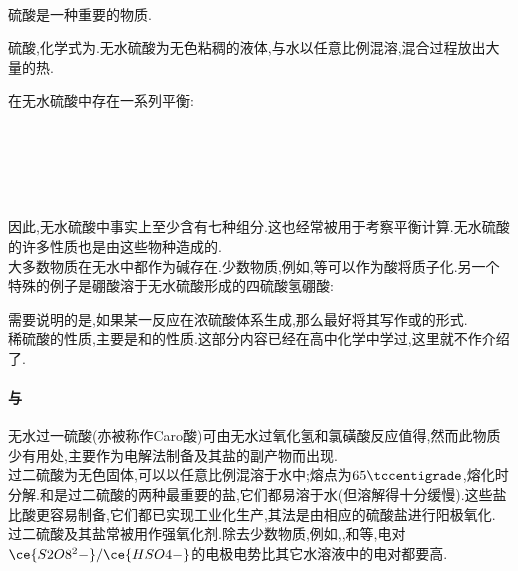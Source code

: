 \documentclass{ctexart}
\begin{document}
\paragraph{}
硫酸是一种重要的物质.
\begin{substance}[\ce{H2SO4}]
    硫酸,化学式为.无水硫酸为无色粘稠的液体,与水以任意比例混溶,混合过程放出大量的热.
\end{substance}
在无水硫酸中存在一系列平衡:
\begin{center}
    \\
    \\
    \\
    \\
\end{center}
因此,无水硫酸中事实上至少含有七种组分.这也经常被用于考察平衡计算.无水硫酸的许多性质也是由这些物种造成的.\\
\indent 大多数物质在无水中都作为碱存在.少数物质,例如,等可以作为酸将质子化.另一个特殊的例子是硼酸溶于无水硫酸形成的四硫酸氢硼酸:
\begin{center}
\end{center}
\indent 需要说明的是,如果某一反应在浓硫酸体系生成,那么最好将其写作或的形式.\\
\indent 稀硫酸的性质,主要是和的性质.这部分内容已经在高中化学中学过,这里就不作介绍了.
\paragraph{与}
无水过一硫酸(亦被称作Caro酸)可由无水过氧化氢和氯磺酸反应值得,然而此物质少有用处,主要作为电解法制备及其盐的副产物而出现.\\
\indent 过二硫酸为无色固体,可以以任意比例混溶于水中;熔点为$65\tccentigrade$,熔化时分解.和是过二硫酸的两种最重要的盐,它们都易溶于水(但溶解得十分缓慢).这些盐比酸更容易制备,它们都已实现工业化生产,其法是由相应的硫酸盐进行阳极氧化.\\
\indent 过二硫酸及其盐常被用作强氧化剂.除去少数物质,例如,,和等,电对$\ce{S2O8^2-}/\ce{HSO4-}$的电极电势比其它水溶液中的电对都要高.
\end{document}
